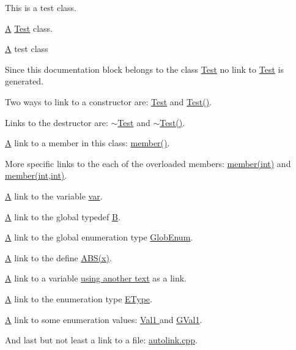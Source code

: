 This is a test class.

\hyperlink{class_a}{A} \hyperlink{class_test}{Test} class.

\hyperlink{class_a}{A} test class

Since this documentation block belongs to the class \hyperlink{class_test}{Test} no link to \hyperlink{class_test}{Test} is generated.

Two ways to link to a constructor are\+: \hyperlink{class_test}{Test} and \hyperlink{class_test_a44e3a28c552193de099601e2910531f1}{Test()}.

Links to the destructor are\+: \hyperlink{class_test_a31b169208ad4fc5344a7b6b8e1fd00c1}{$\sim$\+Test} and \hyperlink{class_test_a31b169208ad4fc5344a7b6b8e1fd00c1}{$\sim$\+Test()}.

\hyperlink{class_a}{A} link to a member in this class\+: \hyperlink{class_test_a703997077e40c222687a0ea2973a9ea1}{member()}.

More specific links to the each of the overloaded members\+: \hyperlink{class_test_ac2f90eeb597ab8382dcdfcdf1df720f1}{member(int)} and \hyperlink{class_test_aea163a1016f022bdb9e4acc3a32fa3eb}{member(int,int)}.

\hyperlink{class_a}{A} link to the variable \hyperlink{class_test_ae75d55c8cf6390227d51c0965a4de296}{var}.

\hyperlink{class_a}{A} link to the global typedef \hyperlink{class_b}{B}.

\hyperlink{class_a}{A} link to the global enumeration type \hyperlink{autolink_8cpp_a656d63cf384d2a6f23c2c18523a7bc5e}{Glob\+Enum}.

\hyperlink{class_a}{A} link to the define \hyperlink{examples_2define_8h_a996f7be338ccb40d1a2a5abc1ad61759}{A\+B\+S(x)}.

\hyperlink{class_a}{A} link to a variable \hyperlink{class_test_ae75d55c8cf6390227d51c0965a4de296}{using another text} as a link.

\hyperlink{class_a}{A} link to the enumeration type \hyperlink{class_test_a0653c5125502203305b6fe839e99ed01}{E\+Type}.

\hyperlink{class_a}{A} link to some enumeration values\+: \hyperlink{class_test_ad8d13fe56b896633273087859b89a1a3af621232782128e49458adf9069e126d4}{Val1 } and \hyperlink{autolink_8cpp_a656d63cf384d2a6f23c2c18523a7bc5ea0f016f49e4f3bcd072319b9d68bc927d}{G\+Val1}.

And last but not least a link to a file\+: \hyperlink{autolink_8cpp}{autolink.\+cpp}.

